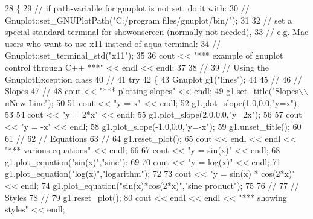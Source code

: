 \begin{DoxyCode}
28 \{
29     \textcolor{comment}{// if path-variable for gnuplot is not set, do it with:}
30     \textcolor{comment}{// Gnuplot::set\_GNUPlotPath("C:/program files/gnuplot/bin/");}
31 
32     \textcolor{comment}{// set a special standard terminal for showonscreen (normally not needed),}
33     \textcolor{comment}{//   e.g. Mac users who want to use x11 instead of aqua terminal:}
34     \textcolor{comment}{// Gnuplot::set\_terminal\_std("x11");}
35 
36     cout << \textcolor{stringliteral}{"*** example of gnuplot control through C++ ***"} << endl << endl;
37 
38     \textcolor{comment}{//}
39     \textcolor{comment}{// Using the GnuplotException class}
40     \textcolor{comment}{//}
41     \textcolor{keywordflow}{try}
42     \{
43         Gnuplot g1(\textcolor{stringliteral}{"lines"});
44 
45         \textcolor{comment}{//}
46         \textcolor{comment}{// Slopes}
47         \textcolor{comment}{//}
48         cout << \textcolor{stringliteral}{"*** plotting slopes"} << endl;
49         g1.set\_title(\textcolor{stringliteral}{"Slopes\(\backslash\)\(\backslash\)nNew Line"});
50 
51         cout << \textcolor{stringliteral}{"y = x"} << endl;
52         g1.plot\_slope(1.0,0.0,\textcolor{stringliteral}{"y=x"});
53 
54         cout << \textcolor{stringliteral}{"y = 2*x"} << endl;
55         g1.plot\_slope(2.0,0.0,\textcolor{stringliteral}{"y=2x"});
56 
57         cout << \textcolor{stringliteral}{"y = -x"} << endl;
58         g1.plot\_slope(-1.0,0.0,\textcolor{stringliteral}{"y=-x"});
59         g1.unset\_title();
60 
61         \textcolor{comment}{//}
62         \textcolor{comment}{// Equations}
63         \textcolor{comment}{//}
64         g1.reset\_plot();
65         cout << endl << endl << \textcolor{stringliteral}{"*** various equations"} << endl;
66 
67         cout << \textcolor{stringliteral}{"y = sin(x)"} << endl;
68         g1.plot\_equation(\textcolor{stringliteral}{"sin(x)"},\textcolor{stringliteral}{"sine"});
69 
70         cout << \textcolor{stringliteral}{"y = log(x)"} << endl;
71         g1.plot\_equation(\textcolor{stringliteral}{"log(x)"},\textcolor{stringliteral}{"logarithm"});
72 
73         cout << \textcolor{stringliteral}{"y = sin(x) * cos(2*x)"} << endl;
74         g1.plot\_equation(\textcolor{stringliteral}{"sin(x)*cos(2*x)"},\textcolor{stringliteral}{"sine product"});
75 
76         \textcolor{comment}{//}
77         \textcolor{comment}{// Styles}
78         \textcolor{comment}{//}
79         g1.reset\_plot();
80         cout << endl << endl << \textcolor{stringliteral}{"*** showing styles"} << endl;

\end{DoxyCode}
